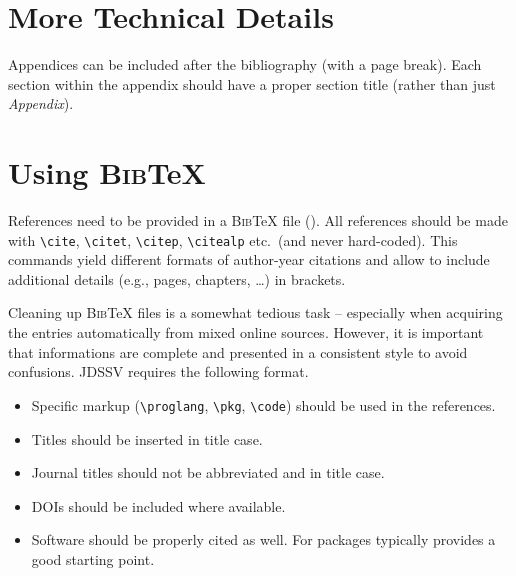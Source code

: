\documentclass[article]{jdssv}\usepackage[]{graphicx}\usepackage[]{color}
\begin{document}




\newpage

\begin{appendix}

\section{More Technical Details} \label{app:technical}


Appendices can be included after the bibliography (with a page break). Each section within the appendix should have a proper section title (rather than just \emph{Appendix}).



\section[Using BibTeX]{Using \textsc{Bib}{\TeX}} \label{app:bibtex}

References need to be provided in a \textsc{Bib}{\TeX} file (). All references should be made with \verb|\cite|, \verb|\citet|, \verb|\citep|, \verb|\citealp| etc.\ (and never hard-coded). This commands yield different formats of author-year citations and allow to include additional details (e.g., pages, chapters, \dots) in brackets. 

Cleaning up \textsc{Bib}{\TeX} files is a somewhat tedious task -- especially when acquiring the entries automatically from mixed online sources. However, it is important that informations are complete and presented in a consistent style to avoid confusions. JDSSV requires the following format.
\begin{itemize}
  \item Specific markup (\verb|\proglang|, \verb|\pkg|, \verb|\code|) should
    be used in the references.
  \item Titles should be inserted in title case.
  \item Journal titles should not be abbreviated and in title case.
  \item DOIs should be included where available.
  \item Software should be properly cited as well. For  packages
     typically provides a good starting point.
\end{itemize}
\end{appendix}
\newpage
\end{document}
